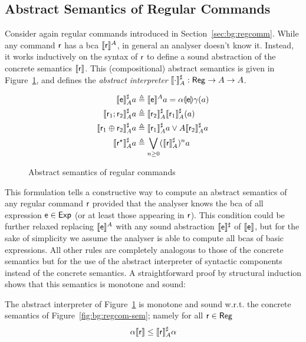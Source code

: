 \subsection{Abstract Semantics of Regular Commands}
Consider again regular commands introduced in Section~\ref{sec:bg:regcomm}. While any command $\mathsf{r}$ has a bca $\llbracket\mathsf{r}\rrbracket^{A}$, in general an analyser doesn't know it. Instead, it works inductively on the syntax of $\mathsf{r}$ to define a sound abstraction of the concrete semantics $\llbracket\mathsf{r}\rrbracket$. This (compositional) abstract semantics is given in Figure~\ref{fig:bg:regcom-abs-sem}, and defines the \emph{abstract interpreter} $\llbracket\cdot\rrbracket^{\sharp}_{A} : \mathsf{Reg} \rightarrow A \rightarrow A$.
\begin{figure}[t]
	\begin{align*}
		\begin{split}
			\llbracket\mathsf{e}\rrbracket^{\sharp}_{A} a                    & \triangleq \llbracket\mathsf{e}\rrbracket^{A} a = \alpha \llparenthesis\mathsf{e}\rrparenthesis \gamma (a)               \\
			\llbracket\mathsf{r}_1 ; \mathsf{r}_2\rrbracket^{\sharp}_{A} a        & \triangleq \llbracket\mathsf{r}_2\rrbracket^{\sharp}_{A} \llbracket\mathsf{r}_1\rrbracket^{\sharp}_{A} (a)        \\
			\llbracket\mathsf{r}_1 \oplus \mathsf{r}_2\rrbracket^{\sharp}_{A} a & \triangleq \llbracket\mathsf{r}_1\rrbracket^{\sharp}_{A} a \vee A \llbracket\mathsf{r}_2\rrbracket^{\sharp}_{A} a \\
			\llbracket\mathsf{r}^\star\rrbracket^{\sharp}_{A} a             & \triangleq \bigvee_{n \ge 0}  (\llbracket\mathsf{r}\rrbracket^{\sharp}_{A})^n a
		\end{split}
	\end{align*}
	\caption{Abstract semantics of regular commands}
	\label{fig:bg:regcom-abs-sem}
\end{figure}
This formulation tells a constructive way to compute an abstract semantics of any regular command $\mathsf{r}$ provided that the analyser knows the bca of all expression $\mathsf{e} \in \mathsf{Exp}$ (or at least those appearing in $\mathsf{r}$). This condition could be further relaxed replacing $\llbracket\mathsf{e}\rrbracket^{A}$ with any sound abstraction $\llbracket\mathsf{e}\rrbracket^{\sharp}$ of $\llbracket\mathsf{e}\rrbracket$, but for the sake of simplicity we assume the analyser is able to compute all bcas of basic expressions. All other rules are completely analogous to those of the concrete semantics but for the use of the abstract interpreter of syntactic components instead of the concrete semantics.
A straightforward proof by structural induction shows that this semantics is monotone and sound:
\begin{prop}
	The abstract interpreter of Figure~\ref{fig:bg:regcom-abs-sem} is monotone and sound w.r.t. the concrete semantics of Figure~\ref{fig:bg:regcom-sem}; namely for all $\mathsf{r} \in \mathsf{Reg}$
	\[
	\alpha \llbracket\mathsf{r}\rrbracket \le \llbracket\mathsf{r}\rrbracket^{\sharp}_A \alpha
	\]
\end{prop}

